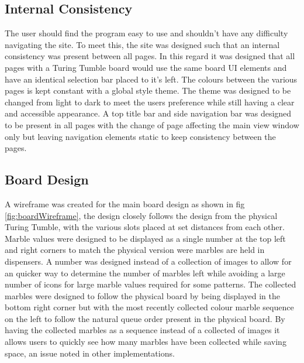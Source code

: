 \documentclass{l4proj}
\begin{document}
\subsection{Internal Consistency}
The user should find the program easy to use and shouldn't have any difficulty navigating the site. To meet this, the site was designed such that an internal consistency was present between all pages. In this regard it was designed that all pages with a Turing Tumble board would use the same board UI elements and have an identical selection bar placed to it's left. The colours between the various pages is kept constant with a global style theme. The theme was designed to be changed from light to dark to meet the users preference while still having a clear and accessible appearance. A top title bar and side navigation bar was designed to be present in all pages with the change of page affecting the main view window only but leaving navigation elements static to keep consistency between the pages.

\subsection{Board Design}
A wireframe was created for the main board design as shown in fig \ref{fig:boardWireframe}, the design closely follows the design from the physical Turing Tumble, with the various slots placed at set distances from each other. Marble values were designed to be displayed as a single number at the top left and right corners to match the physical version were marbles are held in dispensers. A number was designed instead of a collection of images to allow for an quicker way to determine the number of marbles left while avoiding a large number of icons for large marble values required for some patterns. The collected marbles were designed to follow the physical board by being displayed in the bottom right corner but with the most recently collected colour marble sequence on the left to follow the natural queue order present in the physical board. By having the collected marbles as a sequence instead of a collected of images it allows users to quickly see how many marbles have been collected while saving space, an issue noted in other implementations.
\end{document}
